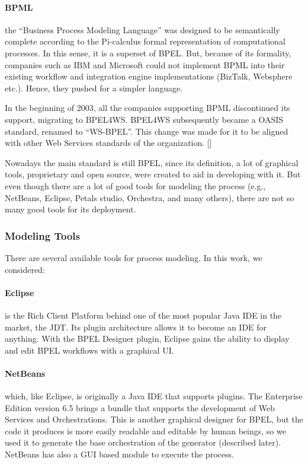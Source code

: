 \paragraph{BPML} 
the ``Business Process Modeling Language'' was designed to be semantically complete according to the Pi-calculus formal representation of computational processes. In this sense, it is a superset of BPEL. But, because of its formality, companies such as IBM and Microsoft could not implement BPML into their existing workflow and integration engine implementations (BizTalk, Websphere etc.). Hence, they pushed for a simpler language.

In the beginning of 2003, all the companies supporting BPML discontinued its support, migrating to BPEL4WS. BPEL4WS subsequently became a OASIS standard, renamed to ``WS-BPEL''. This change was made for it to be aligned with other Web Services standards of the organization. [\citet{OASIS}]

Nowadays the main standard is still BPEL, since its definition, a lot of graphical tools, proprietary and open source, were created to aid in developing with it. But even though there are a lot of good tools for modeling the process (e.g., NetBeans, Eclipse, Petals studio, Orchestra, and many others), there are not so many good tools for its deployment.

\subsubsection{Modeling Tools}
There are several available tools for process modeling. In this work, we considered:

\paragraph{Eclipse}
is the Rich Client Platform behind one of the most popular Java IDE in the market, the JDT. Its plugin architecture allows it to become an IDE for anything. With the BPEL Designer plugin, Eclipse gains the ability to display and edit BPEL workflows with a graphical UI.

\paragraph{NetBeans}
which, like Eclipse, is originally a Java IDE that supports plugins. The Enterprise Edition version 6.5 brings a bundle that supports the development of Web Services and Orchestrations. This is another graphical designer for BPEL, but the code it produces is more easily readable and editable by human beings, so we used it to generate the base orchestration of the generator (described later). NetBeans has also a GUI based module to execute the process.


